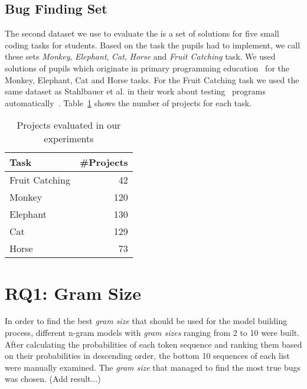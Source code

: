 \subsection{Bug Finding Set}\label{subsec:bugset}
The second dataset we use to evaluate the \ngram{} is a set of solutions for five small coding tasks for students. Based on the task the pupils had to implement, we call these sets \textit{Monkey}, \textit{Elephant}, \textit{Cat}, \textit{Horse} and \textit{Fruit Catching} task.
We used solutions of pupils which originate in primary programming education~\cite{katharina} for the Monkey, Elephant, Cat and Horse tasks. For the Fruit Catching task we used the same dataset as Stahlbauer et al. in their work about testing \scratch\ programs automatically~\cite{whisker}. Table~\ref{tab:big-dataset} shows the number of projects for each task. 
 
\begin{table}[H]
    \centering
    \caption[Projects evaluated in our experiments]{\label{tab:big-dataset}Projects evaluated in our experiments}
    \begin{tabular}{lr}
        \toprule
        Task & \#Projects \\
        \midrule
        Fruit Catching & 42 \\
        Monkey & 120 \\
        Elephant & 130 \\
        Cat & 129 \\
        Horse & 73 \\
        \bottomrule
    \end{tabular}
\end{table}


\section{RQ1: Gram Size}\label{sec:gram_size}
In order to find the best \textit{gram size} that should be used for the model building process, different n-gram models with \textit{gram sizes} ranging from 2 to 10 were built. After calculating the probabilities of each token sequence and ranking them based on their probabilities in descending order, the bottom 10 sequences of each list were manually examined. The \textit{gram size} that managed to find the most true bugs was chosen. (Add result...)



